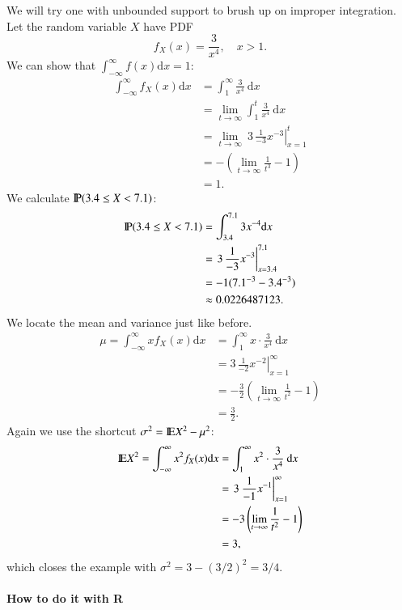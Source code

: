 \documentclass[captions=tableheading]{scrbook}
\begin{document}
\begin{example}
\label{exa:cont-pdf-3x4}

We will try one with unbounded support to brush up on improper integration. Let the random variable \(X\) have PDF
\[
f_{X}(x)=\frac{3}{x^{4}},\quad x>1.
\]
We can show that \(\int_{-\infty}^{\infty}f(x)\mathrm{d} x=1\):
\begin{align*}
\int_{-\infty}^{\infty}f_{X}(x)\mathrm{d} x & =\int_{1}^{\infty}\frac{3}{x^{4}}\:\mathrm{d} x\\
 & =\lim_{t\to\infty}\int_{1}^{t}\frac{3}{x^{4}}\:\mathrm{d} x\\
 & =\lim_{t\to\infty}\ \left.3\,\frac{1}{-3}x^{-3}\right|_{x=1}^{t}\\
 & =-\left(\lim_{t\to\infty}\frac{1}{t^{3}}-1\right)\\
 & =1.
\end{align*}
We calculate \(\P(3.4\leq X<7.1)\):
\begin{align*}
\P(3.4\leq X<7.1) & =\int_{3.4}^{7.1}3x^{-4}\mathrm{d} x\\
 & =\left.3\,\frac{1}{-3}x^{-3}\right|_{x=3.4}^{7.1}\\
 & =-1(7.1^{-3}-3.4^{-3})\\
 & \approx0.0226487123.
\end{align*}
We locate the mean and variance just like before.
\begin{align*}
\mu=\int_{-\infty}^{\infty}xf_{X}(x)\mathrm{d} x & =\int_{1}^{\infty}x\cdot\frac{3}{x^{4}}\:\mathrm{d} x\\
 & =\left.3\,\frac{1}{-2}x^{-2}\right|_{x=1}^{\infty}\\
 & =-\frac{3}{2}\left(\lim_{t\to\infty}\frac{1}{t^{2}}-1\right)\\
 & =\frac{3}{2}.
\end{align*}
Again we use the shortcut \(\sigma^{2}=\E X^{2}-\mu^{2}\):
\begin{align*}
\E X^{2}=\int_{-\infty}^{\infty}x^{2}f_{X}(x)\mathrm{d} x & =\int_{1}^{\infty}x^{2}\cdot\frac{3}{x^{4}}\:\mathrm{d} x\\
 & =\left.3\:\frac{1}{-1}x^{-1}\right|_{x=1}^{\infty}\\
 & =-3\left(\lim_{t\to\infty}\frac{1}{t^{2}}-1\right)\\
 & =3,
\end{align*}
which closes the example with \(\sigma^{2}=3-(3/2)^{2}=3/4\).
\end{example}

\paragraph*{How to do it with \textsf{R}}
\end{document}
